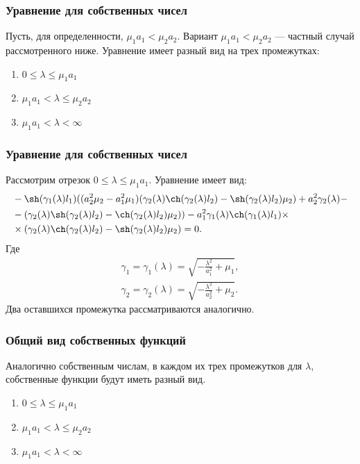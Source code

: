 \documentclass[10pt,pdf,hyperref={unicode}]{beamer}
\begin{document}
\begin{frame}
  \frametitle{Уравнение для собственных чисел}
  Пусть, для определенности, $\mu_1 a_1 < \mu_2 a_2$.
  Вариант $\mu_1 a_1 < \mu_2 a_2$ --- частный случай рассмотренного ниже.
  Уравнение имеет разный вид на трех промежутках:
  \begin{enumerate}
    \item $ 0 \le \lambda \le \mu_1a_1$
    \item $ \mu_1a_1 < \lambda \le \mu_2a_2 $
    \item $\mu_1a_1 < \lambda < \infty$
  \end{enumerate}
\end{frame}
\begin{frame}
  \frametitle{Уравнение для собственных чисел}
  Рассмотрим отрезок $ 0 \le \lambda \le \mu_1a_1$. Уравнение имеет вид: 
  \begin{equation*}
    \begin{aligned}
    & -\sh(\gamma_1(\lambda) l_1) ((a_2^2 \mu_2-a_1^2 \mu_1) (\gamma_2(\lambda) \ch(\gamma_2(\lambda) l_2)-\sh(\gamma_2(\lambda) l_2) \mu_2)+a_2^2 \gamma_2(\lambda)- \\
    & -(\gamma_2(\lambda) \sh(\gamma_2(\lambda) l_2)-\ch(\gamma_2(\lambda) l_2) \mu_2))-a_1^2 \gamma_1(\lambda) \ch(\gamma_1(\lambda) l_1) \times \\
    & \times (\gamma_2(\lambda) \ch(\gamma_2(\lambda) l_2)-\sh(\gamma_2(\lambda) l_2) \mu_2) = 0.
    \end{aligned}
  \end{equation*}
  Где
  \begin{equation*}
    \begin{aligned}
      \gamma_1 = \gamma_1(\lambda) = \sqrt{- \frac{\lambda^2}{a_1^2} + \mu_1}, \\
      \gamma_2 = \gamma_2(\lambda) = \sqrt{- \frac{\lambda^2}{a_2^2} + \mu_2}.
    \end{aligned}
  \end{equation*}
  \pause
  Два оставшихся промежутка рассматриваются аналогично.
\end{frame}

\begin{frame}
  \frametitle{Общий вид собственных функций}
  Аналогично собственным числам, в каждом их трех промежутков для $\lambda$, собственные функции будут иметь разный вид.
  \begin{enumerate}
    \item $ 0 \le \lambda \le \mu_1a_1$
    \item $ \mu_1a_1 < \lambda \le \mu_2a_2 $
    \item $\mu_1a_1 < \lambda < \infty$
  \end{enumerate}
\end{frame}
\end{document}
